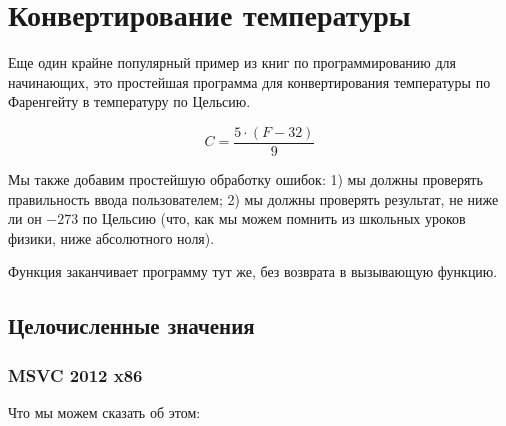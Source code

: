 \section{Конвертирование температуры}

Еще один крайне популярный пример из книг по программированию для начинающих, это простейшая программа
для конвертирования температуры по Фаренгейту в температуру по Цельсию.

\[
	C=\frac{5 \cdot (F-32)}{9}
\]

Мы также добавим простейшую обработку ошибок:
1) мы должны проверять правильность ввода пользователем;
2) мы должны проверять результат, не ниже ли он $-273$ по Цельсию (что, как мы можем помнить из школьных
уроков физики, ниже абсолютного ноля).

Функция  заканчивает программу тут же, без возврата в вызывающую функцию.

\subsection{Целочисленные значения}



\subsubsection{\Optimizing MSVC 2012 x86}



Что мы можем сказать об этом:

